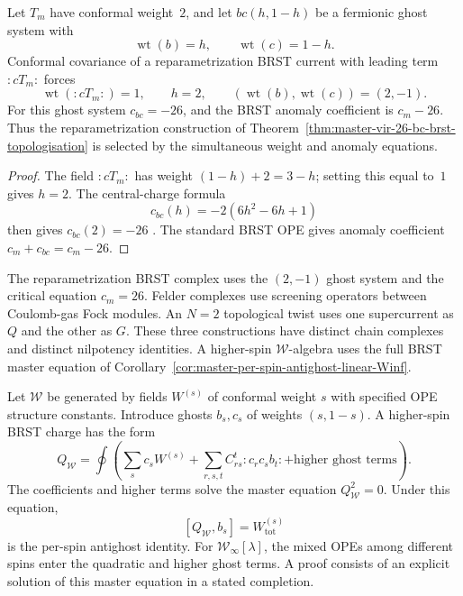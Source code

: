 \begin{theorem}
\label{thm:master-generalized-matter-ghost-brst}
Let $T_m$ have conformal weight~$2$, and let $bc(h,1-h)$ be a
fermionic ghost system with
\[
 \operatorname{wt}(b)=h,
 \qquad
 \operatorname{wt}(c)=1-h.
\]
Conformal covariance of a reparametrization BRST current with leading
term ${:}cT_m{:}$ forces
\[
 \operatorname{wt}({:}cT_m{:})=1,
 \qquad h=2,
 \qquad (\operatorname{wt}(b),\operatorname{wt}(c))=(2,-1).
\]
For this ghost system $c_{bc}=-26$, and the BRST anomaly coefficient
is $c_m-26$.  Thus the reparametrization construction of
Theorem~\ref{thm:master-vir-26-bc-brst-topologisation} is selected by
the simultaneous weight and anomaly equations.
\end{theorem}

\begin{proof}
The field ${:}cT_m{:}$ has weight $(1-h)+2=3-h$; setting this equal
to~$1$ gives $h=2$.  The central-charge formula
\[
 c_{bc}(h)=-2(6h^2-6h+1)
\]
then gives $c_{bc}(2)=-26$
\cite[equation~(2.5.12)]{Pol98}.  The standard BRST OPE gives anomaly
coefficient $c_m+c_{bc}=c_m-26$.
\end{proof}

\begin{remark}
\label{rem:master-generalized-brst-coverage}
The reparametrization BRST complex uses the $(2,-1)$ ghost system and
the critical equation $c_m=26$.  Felder complexes use screening
operators between Coulomb-gas Fock modules.  An $N=2$ topological
twist uses one supercurrent as $Q$ and the other as $G$.  These three
constructions have distinct chain complexes and distinct nilpotency
identities.  A higher-spin $\mathcal W$-algebra uses the full BRST
master equation of
Corollary~\ref{cor:master-per-spin-antighost-linear-Winf}.
\end{remark}

\begin{corollary}
\label{cor:master-per-spin-antighost-linear-Winf}
Let $\mathcal W$ be generated by fields $W^{(s)}$ of conformal weight
$s$ with specified OPE structure constants.  Introduce ghosts
$b_s,c_s$ of weights $(s,1-s)$.  A higher-spin BRST charge has the
form
\[
 Q_{\mathcal W}
 =\oint\left(
 \sum_s c_sW^{(s)}
 +\sum_{r,s,t}C_{rs}^{t}{:}c_rc_sb_t{:}
 +\text{higher ghost terms}
 \right).
\]
The coefficients and higher terms solve the master equation
$Q_{\mathcal W}^2=0$.  Under this equation,
\[
 [Q_{\mathcal W},b_s]=W^{(s)}_{\mathrm{tot}}
\]
is the per-spin antighost identity.  For
$\mathcal W_\infty[\lambda]$, the mixed OPEs among different spins
enter the quadratic and higher ghost terms.  A proof consists of an
explicit solution of this master equation in a stated completion.
\end{corollary}

